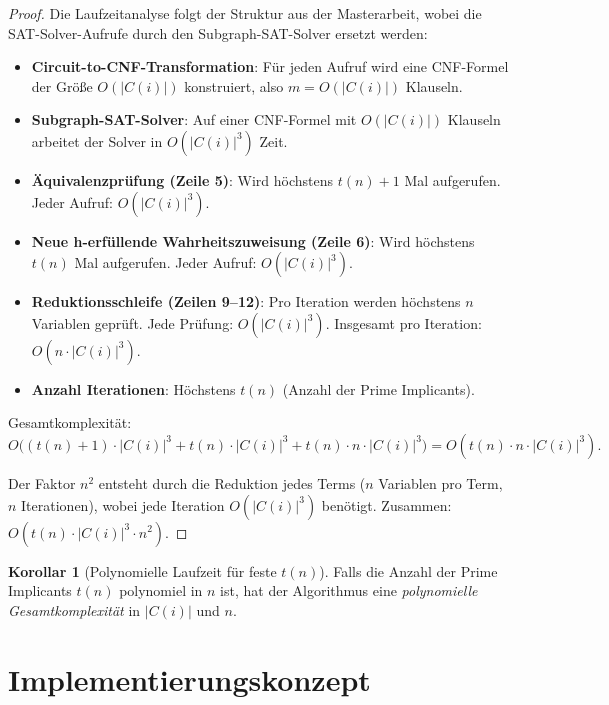 ﻿\documentclass[a4paper,12pt]{article}
\theoremstyle{definition}
\newtheorem{korollar}{Korollar}
\begin{document}
\begin{proof}
    Die Laufzeitanalyse folgt der Struktur aus der Masterarbeit, wobei die SAT-Solver-Aufrufe durch den Subgraph-SAT-Solver ersetzt werden:
    
    \begin{itemize}
        \item[-] \textbf{Circuit-to-CNF-Transformation}: Für jeden Aufruf wird eine CNF-Formel der Größe $O(|C(i)|)$ konstruiert, also $m = O(|C(i)|)$ Klauseln.
        \item[-] \textbf{Subgraph-SAT-Solver}: Auf einer CNF-Formel mit $O(|C(i)|)$ Klauseln arbeitet der Solver in $O(|C(i)|^3)$ Zeit.
        \item[-] \textbf{Äquivalenzprüfung (Zeile 5)}: Wird höchstens $t(n) + 1$ Mal aufgerufen. Jeder Aufruf: $O(|C(i)|^3)$.
        \item[-] \textbf{Neue h-erfüllende Wahrheitszuweisung (Zeile 6)}: Wird höchstens $t(n)$ Mal aufgerufen. Jeder Aufruf: $O(|C(i)|^3)$.
        \item[-] \textbf{Reduktionsschleife (Zeilen 9--12)}: Pro Iteration werden höchstens $n$ Variablen geprüft. Jede Prüfung: $O(|C(i)|^3)$. Insgesamt pro Iteration: $O(n \cdot |C(i)|^3)$.
        \item[-] \textbf{Anzahl Iterationen}: Höchstens $t(n)$ (Anzahl der Prime Implicants).
    \end{itemize}
    
    Gesamtkomplexität:
    \[
    O\big((t(n)+1) \cdot |C(i)|^3 + t(n) \cdot |C(i)|^3 + t(n) \cdot n \cdot |C(i)|^3\big) = O(t(n) \cdot n \cdot |C(i)|^3).
    \]
    
    Der Faktor $n^2$ entsteht durch die Reduktion jedes Terms ($n$ Variablen pro Term, $n$ Iterationen), wobei jede Iteration $O(|C(i)|^3)$ benötigt. Zusammen: $O(t(n) \cdot |C(i)|^3 \cdot n^2)$.
\end{proof}

\begin{korollar}[Polynomielle Laufzeit für feste $t(n)$]
    Falls die Anzahl der Prime Implicants $t(n)$ polynomiel in $n$ ist, hat der Algorithmus eine \textit{polynomielle Gesamtkomplexität} in $|C(i)|$ und $n$.
\end{korollar}

\section{Implementierungskonzept}
\end{document}
